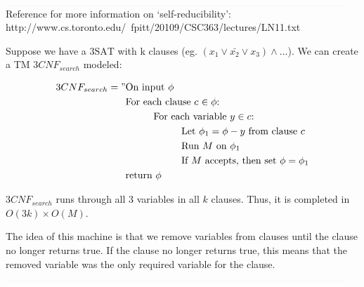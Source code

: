 \documentclass{article}
\newcommand{\class}[1]{\text{#1}}
\newcommand\tab[1][1cm]{\hspace*{#1}}
\begin{document}
\begin{enumerate}
            $\textcolor[RGB]{220,220,220}{\rule{\linewidth}{0.2pt}}$
            Reference for more information on `self-reducibility': http://www.cs.toronto.edu/~fpitt/20109/CSC363/lectures/LN11.txt

            Suppose we have a $\class{3SAT}$ with k clauses (eg. $(x_1 \vee \bar{x_2} \vee x_3) \wedge . . .$). We can create a TM $3CNF_{search}$ modeled:


            \begin{equation}
            	\begin{split}
            		3CNF_{search} = "& \text{On input $\phi$} \\
            				         & \text{For each clause $c$ $\in \phi$:} \\
                                     & \tab\text{For each variable $y \in c$:} \\
                                     & \tab\tab\text{Let $\phi_1 = \phi - y$ from clause $c$} \\
                                     & \tab\tab\text{Run $M$ on $\phi_1$} \\
                                     & \tab\tab\text{If $M$ accepts, then set $\phi = \phi_1$} \\
                                     & \text{return $\phi$}
            	\end{split}
            \end{equation}

            $3CNF_{search}$ runs through all 3 variables in all $k$ clauses. Thus, it is completed in $O(3k) \times O(M)$.

            The idea of this machine is that we remove variables from clauses until the clause no longer returns true. If the clause no longer returns true, this means that the removed variable was the only required variable for the clause.

            $\textcolor[RGB]{220,220,220}{\rule{\linewidth}{0.2pt}}$

\end{enumerate}
\end{document}
